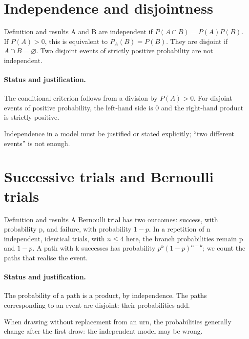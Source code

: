 \section{Independence and disjointness}\label{C05-U3}
\begin{repere}{Definition and results}
A and B are independent if $P(A\cap B)=P(A)P(B)$. If $P(A)>0$, this is equivalent to $P_A(B)=P(B)$. They are disjoint if $A\cap B=\varnothing$. Two disjoint events of strictly positive probability are not independent.
\end{repere}
\paragraph{Status and justification.} The conditional criterion follows from a division by $P(A)>0$. For disjoint events of positive probability, the left-hand side is 0 and the right-hand product is strictly positive.
\label{C05-EX3}
\begin{erreur}Independence in a model must be justified or stated explicitly; ``two different events'' is not enough.\end{erreur}
\label{C05-AP3}
\section{Successive trials and Bernoulli trials}\label{C05-U4}
\begin{repere}{Definition and results}
A Bernoulli trial has two outcomes: success, with probability p, and failure, with probability $1-p$. In a repetition of n independent, identical trials, with $n\leq4$ here, the branch probabilities remain p and $1-p$. A path with k successes has probability $p^k(1-p)^{n-k}$; we count the paths that realise the event.
\end{repere}
\paragraph{Status and justification.} The probability of a path is a product, by independence. The paths corresponding to an event are disjoint: their probabilities add.
\label{C05-EX4}
\begin{erreur}When drawing without replacement from an urn, the probabilities generally change after the first draw: the independent model may be wrong.\end{erreur}
\label{C05-AP4}
